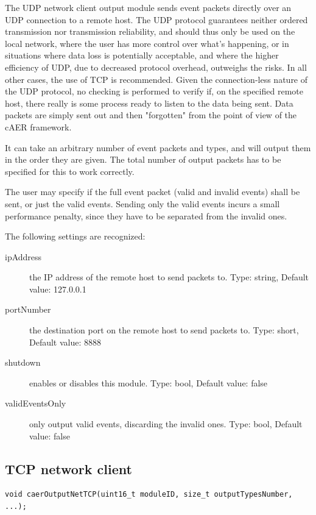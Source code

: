 \documentclass[a4paper,12pt]{report}
\begin{document}
The UDP network client output module sends event packets directly over an UDP connection to a remote host.
The UDP protocol guarantees neither ordered transmission nor transmission reliability, and should thus only be used on the local network, where the user has more control over what's happening, or in situations where data loss is potentially acceptable, and where the higher efficiency of UDP, due to decreased protocol overhead, outweighs the risks. In all other cases, the use of TCP is recommended.
Given the connection-less nature of the UDP protocol, no checking is performed to verify if, on the specified remote host, there really is some process ready to listen to the data being sent. Data packets are simply sent out and then "forgotten" from the point of view of the cAER framework.

It can take an arbitrary number of event packets and types, and will output them in the order they are given. The total number of output packets has to be specified for this to work correctly.

The user may specify if the full event packet (valid and invalid events) shall be sent, or just the valid events. Sending only the valid events incurs a small performance penalty, since they have to be separated from the invalid ones.

The following settings are recognized:
\begin{description}
\item[ipAddress] the IP address of the remote host to send packets to.
\subitem Type: string, Default value: 127.0.0.1
\item[portNumber] the destination port on the remote host to send packets to.
\subitem Type: short, Default value: 8888
\item[shutdown] enables or disables this module.
\subitem Type: bool, Default value: false
\item[validEventsOnly] only output valid events, discarding the invalid ones.
\subitem Type: bool, Default value: false
\end{description}

\subsection{TCP network client} \label{subsec:tcp_network_client}

\begin{lstlisting}
void caerOutputNetTCP(uint16_t moduleID, size_t outputTypesNumber, ...);
\end{lstlisting}
\end{document}

